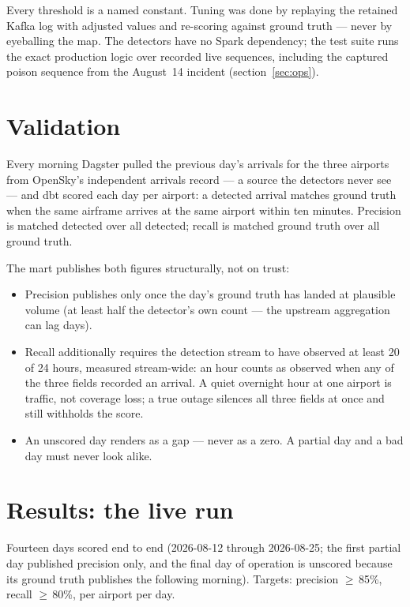 \documentclass[11pt]{article}
\begin{document}
Every threshold is a named constant. Tuning was done by replaying the
retained Kafka log with adjusted values and re-scoring against ground truth
--- never by eyeballing the map. The detectors have no Spark dependency; the
test suite runs the exact production logic over recorded live sequences,
including the captured poison sequence from the August~14 incident
(section~\ref{sec:ops}).

\section{Validation}

Every morning Dagster pulled the previous day's arrivals for the three
airports from OpenSky's independent arrivals record --- a source the
detectors never see --- and dbt scored each day per airport:
a detected arrival matches ground truth when the same airframe arrives at
the same airport within ten minutes. Precision is matched detected over all
detected; recall is matched ground truth over all ground truth.

The mart publishes both figures structurally, not on trust:

\begin{itemize}
\item Precision publishes only once the day's ground truth has landed at
plausible volume (at least half the detector's own count --- the upstream
aggregation can lag days).
\item Recall additionally requires the detection stream to have observed at
least 20 of 24 hours, measured stream-wide: an hour counts as observed when
any of the three fields recorded an arrival. A quiet overnight hour at one
airport is traffic, not coverage loss; a true outage silences all three
fields at once and still withholds the score.
\item An unscored day renders as a gap --- never as a zero. A partial day
and a bad day must never look alike.
\end{itemize}

\section{Results: the live run}

Fourteen days scored end to end (2026-08-12 through 2026-08-25; the first
partial day published precision only, and the final day of operation is
unscored because its ground truth publishes the following morning). Targets:
precision ${\geq}$\,85\%, recall ${\geq}$\,80\%, per airport per day.
\end{document}
